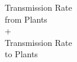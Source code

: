 \documentclass[preview]{standalone}
\begin{document}
\begin{center}
Transmission Rate\\from Plants\\+\\Transmission Rate\\to Plants
\end{center}
\end{document}
